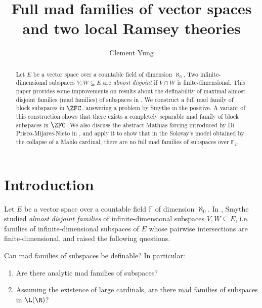 \documentclass[11pt,reqno]{amsart}
\title[Full mad families of vector spaces]{Full mad families of vector spaces and two local Ramsey theories}
\author{Clement Yung}
\begin{document}
\begin{abstract}
    Let $E$ be a vector space over a countable field of dimension $\aleph_0$. Two infinite-dimensional subspaces $V,W \subseteq E$ are \emph{almost disjoint} if $V \cap W$ is finite-dimensional. This paper provides some improvements on results about the definability of maximal almost disjoint families (mad families) of subspaces in \cite{S19}. We construct a full mad family of block subspaces in $\ZFC$, answering a problem by Smythe in the positive. A variant of this construction shows that there exists a completely separable mad family of block subspaces in $\ZFC$. We also discuss the abstract Mathias forcing introduced by Di Prisco-Mijares-Nieto in \cite{DMN15}, and apply it to show that in the Solovay's model obtained by the collapse of a Mahlo cardinal, there are no full mad families of subspaces over $\mathbb{F}_2$.
\end{abstract}

\maketitle

\section{Introduction}
\label{sec:intro}


Let $E$ be a vector space over a countable field $\mathbb{F}$ of dimension $\aleph_0$. In \cite{S19}, Smythe studied \emph{almost disjoint families} of infinite-dimensional subspaces $V,W \subseteq E$, i.e. families of infinite-dimensional subspaces of $E$ whose pairwise intersections are finite-dimensional, and raised the following questions.
\begin{prob}
\label{prob:definable.mad.families}
    Can mad families of subspaces be definable? In particular:
    \begin{enumerate}
        \item Are there analytic mad families of subspaces?
        
        \item Assuming the existence of large cardinals, are there mad families of subspaces in $\L(\R)$?
    \end{enumerate}
\end{prob}
\end{document}

